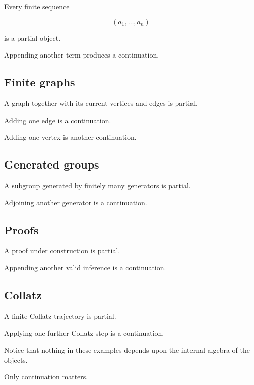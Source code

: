\documentclass[13pt,openany]{book}
\theoremstyle{plain}
\theoremstyle{definition}
\begin{document}
Every finite sequence

\[
(a_1,\ldots,a_n)
\]

is a partial object.

Appending another term produces a continuation.

\vspace{0.5em}

\subsection*{Finite graphs}

A graph together with its current vertices and edges is partial.

Adding one edge is a continuation.

Adding one vertex is another continuation.

\vspace{0.5em}

\subsection*{Generated groups}

A subgroup generated by finitely many generators is partial.

Adjoining another generator is a continuation.

\vspace{0.5em}

\subsection*{Proofs}

A proof under construction is partial.

Appending another valid inference is a continuation.

\vspace{0.5em}

\subsection*{Collatz}

A finite Collatz trajectory is partial.

Applying one further Collatz step is a continuation.

Notice that nothing in these examples depends upon the internal algebra of
the objects.

Only continuation matters.

\end{document}
